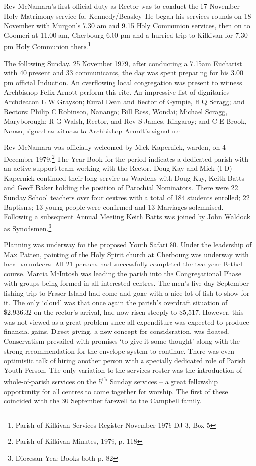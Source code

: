 Rev McNamara's first official duty as Rector was to conduct the 17 November Holy Matrimony service for Kennedy/Beasley. He began his services rounds on 18 November with Murgon's 7.30 am and 9.15 Holy Communion services, then on to Goomeri at 11.00 am, Cherbourg 6.00 pm and a hurried trip to Kilkivan for 7.30 pm Holy Communion there.\footnote{Parish of Kilkivan Services Register November 1979 DJ 3, Box 5}

The following Sunday, 25 November 1979, after conducting a 7.15am Eucharist with 40 present and 33 communicants, the day was spent preparing for his 3.00 pm official Induction. An overflowing local congregation was present to witness Archbishop Felix Arnott perform this rite. An impressive list of dignitaries - Archdeacon L W Grayson; Rural Dean and Rector of Gympie, B Q Scragg; and Rectors: Philip C Robinson, Nanango; Bill Ross, Wondai; Michael Scragg, Maryborough; R G Walsh, Rector, and Rev S James, Kingaroy; and C E Brook, Noosa, signed as witness to Archbishop Arnott's signature.

Rev McNamara was officially welcomed by Mick Kapernick, warden, on 4 December 1979.\footnote{Parish of Kilkivan Minutes, 1979, p. 118} The Year Book for the period indicates a dedicated parish with an active support team working with the Rector. Doug Kay and Mick (I D) Kapernick continued their long service as Wardens with Doug Kay, Keith Batts and Geoff Baker holding the position of Parochial Nominators. There were 22 Sunday School teachers over four centres with a total of 184 students enrolled; 22 Baptisms; 13 young people were confirmed and 13 Marriages solemnised. Following a subsequent Annual Meeting Keith Batts was joined by John Waldock as Synodsmen.\footnote{Diocesan Year Books both p. 82}

Planning was underway for the proposed Youth Safari 80. Under the leadership of Max Patten, painting of the Holy Spirit church at Cherbourg was underway with local volunteers. All 21 persons had successfully completed the two-year Bethel course. Marcia McIntosh was leading the parish into the Congregational Phase with groups being formed in all interested centres. The men's five-day September fishing trip to Fraser Island had come and gone with a nice lot of fish to show for it. The only `cloud' was that once again the parish's overdraft situation of \$2,936.32 on the rector's arrival, had now risen steeply to \$5,517. However, this was not viewed as a great problem since all expenditure was expected to produce financial gains. Direct giving, a new concept for consideration, was floated. Conservatism prevailed with promises `to give it some thought' along with the strong recommendation for the envelope system to continue. There was even optimistic talk of hiring another person with a specially dedicated role of Parish Youth Person. The only variation to the services roster was the introduction of whole-of-parish services on the 5\textsuperscript{th} Sunday services -- a great fellowship opportunity for all centres to come together for worship. The first of these coincided with the 30 September farewell to the Campbell family.


